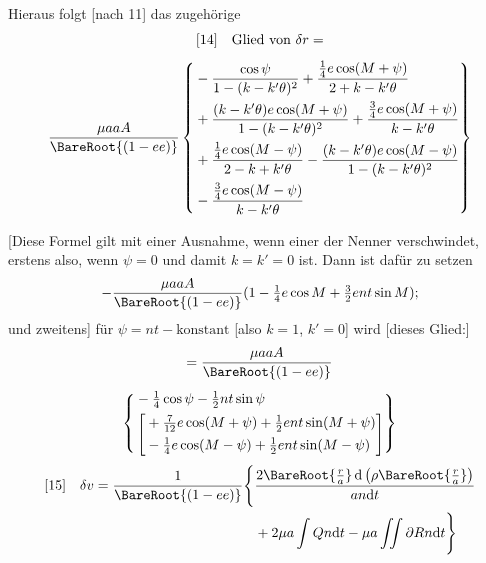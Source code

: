 Hieraus folgt [nach 11] das zugehörige
\[
\begin{gathered}
{}[14]\quad\text{Glied von }\delta r=\\[1ex]
\frac{\mu aaA}{\BareRoot{(1-ee)}}\left\{\begin{aligned}
&-\frac{\cos\psi}{1-(k-k'\theta)^2}+\frac{\tfrac14e\cos(M+\psi)}{2+k-k'\theta}\\
&+\frac{(k-k'\theta)e\cos(M+\psi)}{1-(k-k'\theta)^2}+\frac{\tfrac34e\cos(M+\psi)}{k-k'\theta}\\
&+\frac{\tfrac14e\cos(M-\psi)}{2-k+k'\theta}-\frac{(k-k'\theta)e\cos(M-\psi)}{1-(k-k'\theta)^2}\\
&-\frac{\tfrac34e\cos(M-\psi)}{k-k'\theta}
\end{aligned}\right\}
\end{gathered}
\]

[Diese Formel gilt mit einer Ausnahme, wenn einer der Nenner verschwindet, erstens also, wenn \(\psi=0\) und damit \(k=k'=0\) ist. Dann ist dafür zu setzen
\[
-\frac{\mu aaA}{\BareRoot{(1-ee)}}(1-\tfrac14e\cos M+\tfrac32ent\sin M);
\]
\noindent und zweitens] für \(\psi=nt-\text{konstant}\) [also \(k=1\), \(k'=0\)] wird [dieses Glied:]
\[
\begin{gathered}
=\frac{\mu aaA}{\BareRoot{(1-ee)}}\\[1ex]
\left\{\begin{aligned}
&-\tfrac14\cos\psi-\tfrac12nt\sin\psi\\
&\left[\begin{aligned}
&+\tfrac7{12}e\cos(M+\psi)+\tfrac12ent\sin(M+\psi)\\
&-\tfrac14e\cos(M-\psi)+\tfrac12ent\sin(M-\psi)
\end{aligned}\right]
\end{aligned}\right\}
\end{gathered}
\]
\[
\begin{aligned}
{}[15]\quad\delta v=\frac1{\BareRoot{(1-ee)}}\Bigg\{&\frac{2\BareRoot{\frac ra}\,\mathrm{d}\left(\rho\BareRoot{\frac ra}\right)}{an\mathrm{d}t}\\
&+2\mu a\int Qn\mathrm{d}t-\mu a\iint\partial Rn\mathrm{d}t\Bigg\}
\end{aligned}
\]


